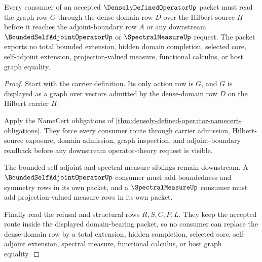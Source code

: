 \begin{theorem}
\label{thm:densely-defined-operator-domain-nonescape}
Every consumer of an accepted $\DenselyDefinedOperatorUp$ packet must read the graph row $G$ through the dense-domain row $D$ over the Hilbert source $H$ before it reaches the adjoint-boundary row $A$ or any downstream $\BoundedSelfAdjointOperatorUp$ or $\SpectralMeasureUp$ request. The packet exports no total bounded extension, hidden domain completion, selected core, self-adjoint extension, projection-valued measure, functional calculus, or host graph equality.
\end{theorem}
\begin{proof}
Start with the carrier definition. Its only action row is $G$, and $G$ is displayed as a graph over vectors admitted by the dense-domain row $D$ on the Hilbert carrier $H$.

Apply the NameCert obligations of \autoref{thm:densely-defined-operator-namecert-obligations}. They force every consumer route through carrier admission, Hilbert-source exposure, domain admission, graph inspection, and adjoint-boundary readback before any downstream operator-theory request is visible.

The bounded self-adjoint and spectral-measure siblings remain downstream. A $\BoundedSelfAdjointOperatorUp$ consumer must add boundedness and symmetry rows in its own packet, and a $\SpectralMeasureUp$ consumer must add projection-valued measure rows in its own packet.

Finally read the refusal and structural rows $R,S,C,P,L$. They keep the accepted route inside the displayed domain-bearing packet, so no consumer can replace the dense-domain row by a total extension, hidden completion, selected core, self-adjoint extension, spectral measure, functional calculus, or host graph equality.
\end{proof}


\begin{closurestatus}{\DenselyDefinedOperatorUp}
  \theoryclosure{\seedClosure}
  \formalstatus{\unformalizedV}
\end{closurestatus}
